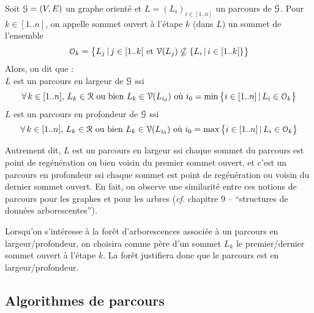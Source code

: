 		\eqskip{2mm}
		\begin{Definition}
			Soit \(\EuScript{G} = (V,E)\) un graphe orienté et \(L = (L_i)_{i\in[1..n]}\) un parcours de \(\EuScript{G}\). \nt
			Pour \(k\in[1..n]\), on appelle sommet ouvert à l'étape \(k\) (dans \(L\)) un sommet de l'ensemble
				\[
					\EuScript{O}_k = \left\{L_j\,|\, j\in [1..k[ \text{ et } \EuScript{V}(L_j) \nsubseteq \{L_i\,|\, i\in[1..k[\} \right\}
				\]
			Alors, on dit que : \eqskip{1mm} \\
				 \bdot \(L\) est un parcours en largeur de \(\EuScript{G}\) ssi
					\[
						\forall\,k\in[1..n],\, L_k\in \EuScript{R} \text{ ou bien } L_k \in \EuScript{V}(L_{i_0}) \text{ où } i_0 = \min\left\{i\in[1..n]\,|\, L_i \in \EuScript{O}_k\right\}
					\]
				 \bdot \(L\) est un parcours en profondeur de \(\EuScript{G}\) ssi
					\[
						\forall\, k\in[1..n],\, L_k \in \EuScript{R} \text{ ou bien } L_k \in \EuScript{V}(L_{i_0}) \text{ où } i_0 = \max\left\{i\in[1..n]\,|\, L_i \in \EuScript{O}_k\right\}
					\]
		\end{Definition}
		
		\begin{Remarque}
			Autrement dit, \(L\) est un parcours en largeur ssi chaque sommet du parcours est point de regénération ou bien voisin du premier sommet ouvert, et c'est un parcours en profondeur ssi chaque sommet est point de regénération ou voisin du dernier sommet ouvert. \nt
			En fait, on observe une similarité entre ces notions de parcours pour les graphes et pour les arbres (\emph{cf.} chapitre 9 -- ``structures de données arborescentes'').
		\end{Remarque}
		
		\vs{2}
		\begin{Remarque}
			Lorsqu'on s'intéresse à la forêt d'arborescences associée à un parcours en largeur/profondeur, on choisira comme père d'un sommet \(L_k\) le premier/dernier sommet ouvert  à l'étape \(k\). La forêt justifiera donc que le parcours est en largeur/profondeur.
		\end{Remarque}
		
		\begin{Exemple}
		\end{Exemple}
	
	\subsection{Algorithmes de parcours}
	
